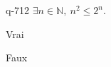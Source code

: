 \begin{truefalse}{q-712}
$\exists n \in \mathbb N,\: n^2\leq 2^n$.
\item* Vrai
\item Faux
\end{truefalse}

